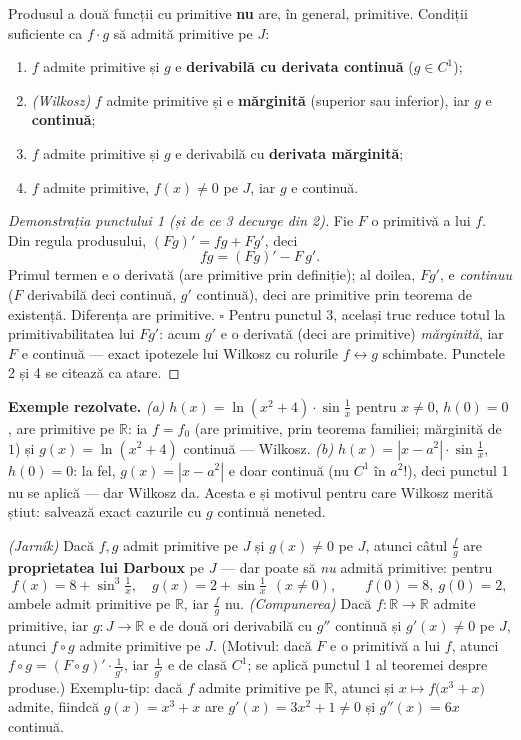 \begin{teorema}
Produsul a două funcții cu primitive \textbf{nu} are, în general, primitive. Condiții suficiente ca $f\cdot g$ să admită primitive pe $J$:
\begin{enumerate}[leftmargin=*, itemsep=2pt]
\item $f$ admite primitive și $g$ e \textbf{derivabilă cu derivata continuă} ($g\in C^1$);
\item \emph{(Wilkosz)} $f$ admite primitive și e \textbf{mărginită} (superior sau inferior), iar $g$ e \textbf{continuă};
\item $f$ admite primitive și $g$ e derivabilă cu \textbf{derivata mărginită};
\item $f$ admite primitive, $f(x)\neq0$ pe $J$, iar $g$ e continuă.
\end{enumerate}
\end{teorema}
\begin{proof}[Demonstrația punctului 1 (și de ce 3 decurge din 2)]
Fie $F$ o primitivă a lui $f$. Din regula produsului, $(Fg)'=fg+Fg'$, deci
\[
f g=(Fg)'-F\,g'.
\]
Primul termen e o derivată (are primitive prin definiție); al doilea, $Fg'$, e \emph{continuu} ($F$ derivabilă deci continuă, $g'$ continuă), deci are primitive prin teorema de existență. Diferența are primitive. $\square$ \quad Pentru punctul 3, același truc reduce totul la primitivabilitatea lui $Fg'$: acum $g'$ e o derivată (deci are primitive) \emph{mărginită}, iar $F$ e continuă --- exact ipotezele lui Wilkosz cu rolurile $f\leftrightarrow g$ schimbate. Punctele 2 și 4 se citează ca atare.
\end{proof}

\textbf{Exemple rezolvate.} \emph{(a)} $h(x)=\ln(x^2+4)\cdot\sin\frac1x$ pentru $x\neq0$, $h(0)=0$, are primitive pe $\mathbb{R}$: ia $f=f_0$ (are primitive, prin teorema familiei; mărginită de $1$) și $g(x)=\ln(x^2+4)$ continuă --- Wilkosz. \emph{(b)} $h(x)=|x-a^2|\cdot\sin\frac1x$, $h(0)=0$: la fel, $g(x)=|x-a^2|$ e doar continuă (nu $C^1$ în $a^2$!), deci punctul 1 nu se aplică --- dar Wilkosz da. Acesta e și motivul pentru care Wilkosz merită știut: salvează exact cazurile cu $g$ continuă neneted.

\begin{teorema}
\emph{(Jarník)} Dacă $f,g$ admit primitive pe $J$ și $g(x)\neq0$ pe $J$, atunci câtul $\frac fg$ are \textbf{proprietatea lui Darboux} pe $J$ --- dar poate să \emph{nu} admită primitive: pentru
\[
f(x)=8+\sin^3\tfrac1x,\quad g(x)=2+\sin\tfrac1x\ \ (x\neq0),\qquad f(0)=8,\ g(0)=2,
\]
ambele admit primitive pe $\mathbb{R}$, iar $\frac fg$ nu. \emph{(Compunerea)} Dacă $f:\mathbb{R}\to\mathbb{R}$ admite primitive, iar $g:J\to\mathbb{R}$ e de două ori derivabilă cu $g''$ continuă și $g'(x)\neq0$ pe $J$, atunci $f\circ g$ admite primitive pe $J$. (Motivul: dacă $F$ e o primitivă a lui $f$, atunci $f\circ g=(F\circ g)'\cdot\frac1{g'}$, iar $\frac1{g'}$ e de clasă $C^1$; se aplică punctul 1 al teoremei despre produse.) Exemplu-tip: dacă $f$ admite primitive pe $\mathbb{R}$, atunci și $x\mapsto f\big(x^3+x\big)$ admite, fiindcă $g(x)=x^3+x$ are $g'(x)=3x^2+1\neq0$ și $g''(x)=6x$ continuă.
\end{teorema}

